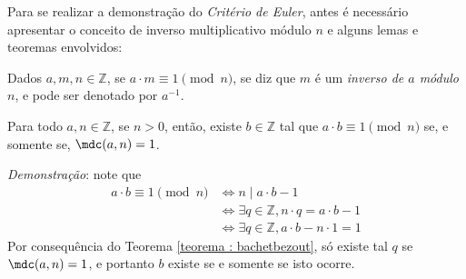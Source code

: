 Para se realizar a demonstração do \textit{Critério de Euler}, antes é necessário apresentar o conceito de inverso multiplicativo módulo $n$ e alguns lemas e teoremas envolvidos:

\begin{definição}
Dados $a, m, n \in \mathbb{Z}$, se $a \cdot m \equiv 1 \pmod n$, se diz que $m$ é um \textit{inverso de $a$ módulo $n$}, e pode ser denotado por $a^{-1}$.
\end{definição}

\begin{lema} \label{lema : mdcinv}
    Para todo $a, n \in \mathbb{Z}$, se $n > 0$, então, existe $b \in \mathbb{Z}$ tal que $a \cdot b \equiv 1 \pmod{n}$ se, e somente se, $\mdc(a, n) = 1$.
\end{lema}
\noindent
\textit{Demonstração}: note que
    \begin{align*}
        a \cdot b \equiv 1 \pmod{n} & \Longleftrightarrow n \mid a \cdot b - 1
        \\
        & 
        \Longleftrightarrow \exists q \in \mathbb{Z}, n \cdot q = a \cdot b - 1
        \\
        & 
        \Longleftrightarrow \exists q \in \mathbb{Z},  a \cdot b - n \cdot 1  = 1
    \end{align*}
Por consequência do Teorema \ref{teorema : bachetbezout}, só existe tal $q$ se $\mdc(a, n) = 1$, e portanto $b$ existe se e somente se isto ocorre.

